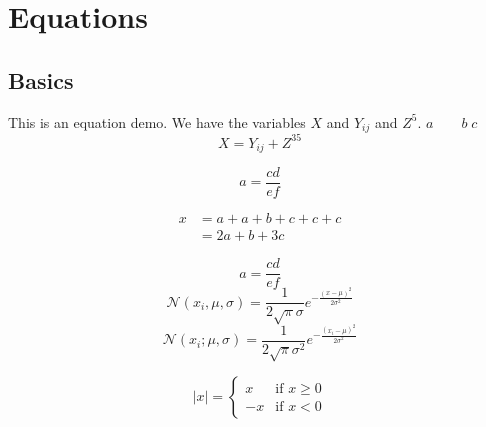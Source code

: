 \documentclass{article}
\begin{document}
\section{Equations}
    \subsection{Basics}
    This is an equation demo. We have the variables $X$ and $Y_{ij}$ and $Z^{5}$. $a \qquad b \; c$
        \begin{equation}
            X = Y_{ij} + Z^{35}
        \end{equation}
        
        \begin{equation*}
            a = \frac{cd}{ef}
        \end{equation*}

        \begin{align}
            x 
            & = a + a + b + c + c + c \nonumber \\   %
            & =  2a + b + 3c
        \end{align}

        $$a = \frac{cd}{ef}$$
        $$
        \mathcal{N}(x_i, \mu, \sigma) = \frac{1}{2\sqrt{\pi}\sigma} e ^{-\frac{(x-\mu)^{2}}{2\sigma^2} }
        $$
        $$
        \mathcal{}
        $$
        $$\mathcal{N}(x_i; \mu, \sigma) = \frac{1}{2\sqrt{\pi}\sigma^2} e^{-\frac{(x_i-\mu)^2}{2\sigma^2}}$$


        $$|x| = \begin{cases}
                    x & \text{if } x \geq 0 \\
                    -x & \text{if } x < 0
                \end{cases}$$
\end{document}
